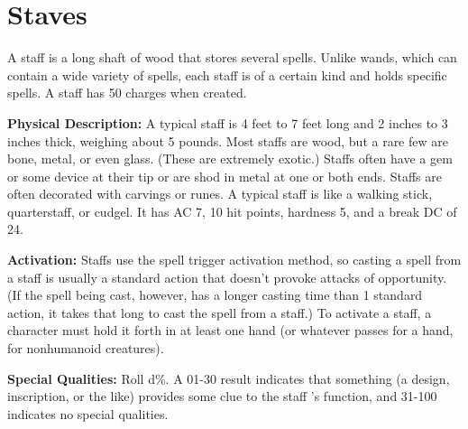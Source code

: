 \section{Staves}

A staff is a long shaft of wood that stores several spells. Unlike wands, which 
can contain a wide variety of spells, each staff is of a certain kind and holds 
specific spells. A staff has 50 charges when created.

\textbf{Physical Description:} A typical staff is 4 feet to 7 feet long and 2 inches 
to 3 inches thick, weighing about 5 pounds. Most staffs are wood, but a rare few 
are bone, metal, or even glass. (These are extremely exotic.) Staffs often have 
a gem or some device at their tip or are shod in metal at one or both ends. Staffs 
are often decorated with carvings or runes. A typical staff is like a walking stick, 
quarterstaff, or cudgel. It has AC 7, 10 hit points, hardness 5, and a break DC 
of 24.

\textbf{Activation:} Staffs use the spell trigger activation method, so casting 
a spell from a staff is usually a standard action that doesn't provoke attacks 
of opportunity. (If the spell being cast, however, has a longer casting time than 
1 standard action, it takes that long to cast the spell from a staff.) To activate 
a staff, a character must hold it forth in at least one hand (or whatever passes 
for a hand, for nonhumanoid creatures).

\textbf{Special Qualities:} Roll d\%. A 01-30 result indicates that something (a 
design, inscription, or the like) provides some clue to the staff 's function, 
and 31-100 indicates no special qualities.

